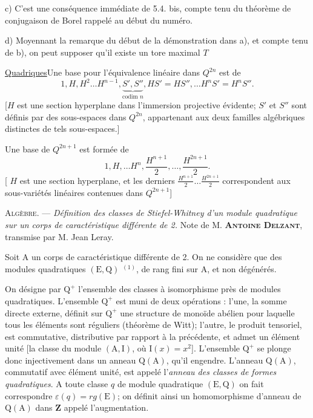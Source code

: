 c) C'est une conséquence immédiate de  5.4. bis, compte tenu du théorème de conjugaison de Borel rappelé au début du numéro.

d) Moyennant la remarque du début de la démonstration dans a), et compte tenu de b), on peut supposer qu'il existe un tore maximal $T$

\uline{Quadriques}\quad Une base pour l'équivalence linéaire dans
$Q^{2n}$ est  de
\[
1,H,H^2\ldots H^{n-1},
\underbrace{S',S''}_{\text{codim }n},
HS'=HS'',\ldots H^nS'=H^nS''.
\]
[$H$ est une section hyperplane dans l'immersion projective évidente;
$S'$ et $S''$ sont définis par des sous-espaces
dans $Q^{2n}$, appartenant aux deux familles algébriques distinctes
de tels sous-espaces.]

Une base de $Q^{2n+1}$ est formée de
\[
1,H,\ldots H^n,\frac{H^{n+1}}2,\ldots,\frac{H^{2n+1}}2.
\]
[ $H$ est une section hyperplane, et  les derniers
$\frac{H^{n+1}}2\ldots\frac{H^{2n+1}}2$ correspondent aux sous-variétés
linéaires contenues dans $Q^{2n+1}$]


\textsc{Algèbre.} --- \textit{Définition des classes de Stiefel-Whitney d'un module
quadratique sur un corps de caractéristique différente de 2.}
Note de M. \textbf{\textsc{Antoine Delzant}}, transmise par M. Jean Leray.

Soit $\mathrm A$ un corps de caractéristique différente de 2. On ne considère que
des modules quadratiques $(\mathrm E,\mathrm Q)$ $^{(1)}$, de rang fini sur $\mathrm A$,
et non dégénérés.

On désigne par $\mathrm Q^+$ l'ensemble des classes à isomorphisme près de modules
quadratiques. L'ensemble $\mathrm Q^+$ est muni de deux opérations : l'une, la somme
directe externe, définit sur $\mathrm Q^+$ une structure de monoïde abélien pour laquelle
tous les éléments sont réguliers (théorème de Witt); l'autre, le produit tensoriel,
est commutative, distributive par rapport à la précédente, et admet un élément unité
[la classe du module $(\mathrm A,\mathrm I)$, où $\mathrm I(x)=x^2$].
L'ensemble $\mathrm Q^+$ se plonge donc injectivement dans un anneau $\mathrm Q(\mathrm A)$,
qu'il engendre. L'anneau $\mathrm Q(\mathrm A)$, commutatif avec élément unité, est appelé
l'\textit{anneau des classes de formes quadratiques}. A toute classe $q$ de module
quadratique $(\mathrm E,\mathrm Q)$ on fait correspondre $\varepsilon(q)=rg(\mathrm E)$;
on définit ainsi un homomorphisme d'anneau de $\mathrm Q(\mathrm A)$ dans $\mathbf Z$
appelé l'augmentation.

